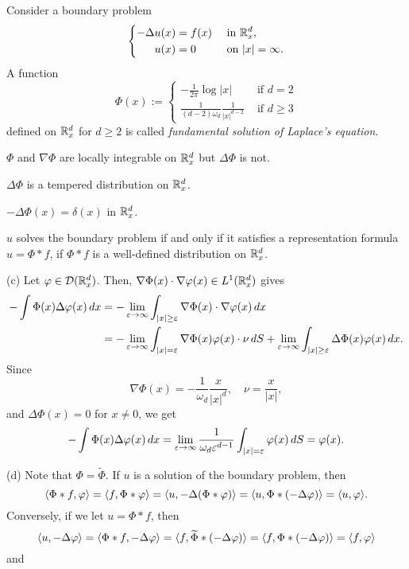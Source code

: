 \documentclass{../note}
\begin{document}
\begin{prb}
Consider a boundary problem
\[\left\{\begin{alignedat}{2}
-\Delta u(x)&=f(x) &\quad&\text{ in }\mathbb{R}_x^d,\\
u(x)&=0 &&\text{ on }|x|=\infty.
\end{alignedat}\right.\]
A function
\[\Phi(x):=\begin{cases}-\frac1{2\pi}\log|x|&\text{ if }d=2\\\frac1{(d-2)\omega_d}\frac1{|x|^{d-2}}&\text{ if }d\ge3\end{cases}\]
defined on $\mathbb{R}_x^d$ for $d\ge2$ is called \emph{fundamental solution of Laplace's equation}.
\begin{parts}
\item $\Phi$ and $\nabla\Phi$ are locally integrable on $\mathbb{R}_x^d$ but $\Delta\Phi$ is not.
\item $\Delta\Phi$ is a tempered distribution on $\mathbb{R}_x^d$.
\item $-\Delta\Phi(x)=\delta(x)$ in $\mathbb{R}_x^d$.
\item $u$ solves the boundary problem if and only if it satisfies a representation formula $u=\Phi*f$, if $\Phi*f$ is a well-defined distribution on $\mathbb{R}_x^d$.
\end{parts}
\end{prb}
\begin{pf}
(c)
Let $\varphi\in\mathcal{D}(\mathbb{R}_x^d)$.
Then, $\nabla\Phi(x)\cdot\nabla\varphi(x)\in L^1(\mathbb{R}_x^d)$ gives
\begin{align*}
-\int\Phi(x)\Delta\varphi(x)\,dx
&=-\lim_{\varepsilon\to\infty}\int_{|x|\ge\varepsilon}\nabla\Phi(x)\cdot\nabla\varphi(x)\,dx\\
&=-\lim_{\varepsilon\to\infty}\int_{|x|=\varepsilon}\nabla\Phi(x)\varphi(x)\cdot\nu\,dS
+\lim_{\varepsilon\to\infty}\int_{|x|\ge\varepsilon}\Delta\Phi(x)\varphi(x)\,dx.
\end{align*}
Since
\[\nabla\Phi(x)=-\frac1{\omega_d}\frac x{|x|^d},\quad\nu=\frac x{|x|},\]
and $\Delta\Phi(x)=0$ for $x\ne0$, we get
\[-\int\Phi(x)\Delta\varphi(x)\,dx=\lim_{\varepsilon\to\infty}\frac1{\omega_d\varepsilon^{d-1}}\int_{|x|=\varepsilon}\varphi(x)\,dS=\varphi(x).\]

(d)
Note that $\Phi=\tilde\Phi$.
If $u$ is a solution of the boundary problem, then
\[\langle\Phi*f,\varphi\rangle=\langle f,\Phi*\varphi\rangle=\langle u,-\Delta(\Phi*\varphi)\rangle=\langle u,\Phi*(-\Delta\varphi)\rangle=\langle u,\varphi\rangle.\]
Conversely, if we let $u=\Phi*f$, then
\[\langle u,-\Delta\varphi\rangle=\langle\Phi*f,-\Delta\varphi\rangle=\langle f,\widetilde\Phi*(-\Delta\varphi)\rangle=\langle f,\Phi*(-\Delta\varphi)\rangle=\langle f,\varphi\rangle\]
and
\end{pf}
\end{document}

